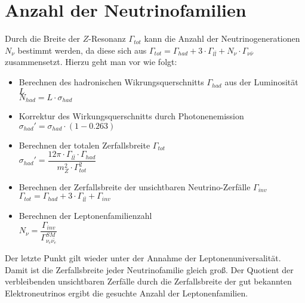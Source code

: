 \documentclass{include/thesisclass3}
\newcommand{\cc}{\cdot}
\begin{document}
\section{Anzahl der Neutrinofamilien}
Durch die Breite der $Z$-Resonanz $\Gamma_{tot}$ kann die Anzahl der Neutrinogenerationen $N_\nu$ bestimmt werden, da diese sich aus $\Gamma_{tot} = \Gamma_{had} + 3 \cc \Gamma_{l \bar l} + N_\nu \cc \Gamma_{\nu \bar \nu}$ zusammensetzt. Hierzu geht man vor wie folgt:\\
\begin{itemize}
\item Berechnen des hadronischen Wikrungsquerschnitts $\Gamma_{had}$ aus der Luminosität $L$\\
$N_{had}=L\cdot \sigma_{had}$

\item Korrektur des Wirkungsquerschnitts durch Photonenemission\\
$\sigma_{had}'=\sigma_{had}\cdot(1-0.263) $

\item Berechnen der totalen Zerfallsbreite $\Gamma_{tot}$\\
$\sigma_{had}'=\dfrac{12 \pi \cdot \Gamma_{l\bar{l}}\cdot \Gamma_{had}}{m_Z^2\cdot \Gamma_{tot}^2}$
\item Berechnen der Zerfallsbreite der unsichtbaren Neutrino-Zerfälle $\Gamma_{inv}$\\
$\Gamma_{tot} = \Gamma_{had} + 3 \cc \Gamma_{l \bar l} + \Gamma_{inv}$

\item Berechnen der Leptonenfamilienzahl\\
$N_\nu=\dfrac{\Gamma_{inv}}{\Gamma_{\nu_e\bar{\nu_e}}^{SM}}$
\end{itemize}
Der letzte Punkt gilt wieder unter der Annahme der Leptonenuniversalität. Damit ist die Zerfallsbreite jeder Neutrinofamilie gleich groß. Der Quotient der verbleibenden unsichtbaren Zerfälle durch die Zerfallsbreite der gut bekannten Elektroneutrinos ergibt die gesuchte Anzahl der Leptonenfamilien.
\end{document}
